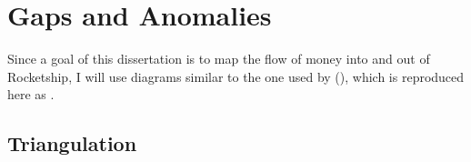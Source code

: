   
  


\section{Gaps and Anomalies}\label{sec:findings-gaps-anomolies}\indent

Since a goal of this dissertation is to map the flow of money into and out of Rocketship, I will use diagrams similar to the one used by \citeauthor{Baker.Miron2015} (\citeyear{Baker.Miron2015}), which is reproduced here as .

\subsection{Triangulation}\label{sec:findings-triangulation}\indent

